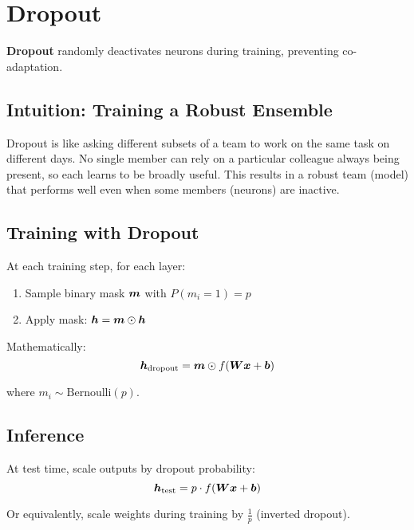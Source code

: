 
\section{Dropout }
\label{sec:dropout}

\textbf{Dropout} randomly deactivates neurons during training, preventing co-adaptation.

\subsection{Intuition: Training a Robust Ensemble}

Dropout is like asking different subsets of a team to work on the same task on different days. No single member can rely on a particular colleague always being present, so each learns to be broadly useful. This results in a robust team (model) that performs well even when some members (neurons) are inactive.

\subsection{Training with Dropout}

At each training step, for each layer:
\begin{enumerate}
    \item Sample binary mask $\boldsymbol{m}$ with $P(m_i = 1) = p$
    \item Apply mask: $\boldsymbol{h} = \boldsymbol{m} \odot \boldsymbol{h}$
\end{enumerate}

Mathematically:
\begin{equation}
\boldsymbol{h}_{\text{dropout}} = \boldsymbol{m} \odot f(\boldsymbol{W}\boldsymbol{x} + \boldsymbol{b})
\end{equation}

where $m_i \sim \text{Bernoulli}(p)$.

\subsection{Inference}

At test time, scale outputs by dropout probability:
\begin{equation}
\boldsymbol{h}_{\text{test}} = p \cdot f(\boldsymbol{W}\boldsymbol{x} + \boldsymbol{b})
\end{equation}

Or equivalently, scale weights during training by $\frac{1}{p}$ (inverted dropout).

